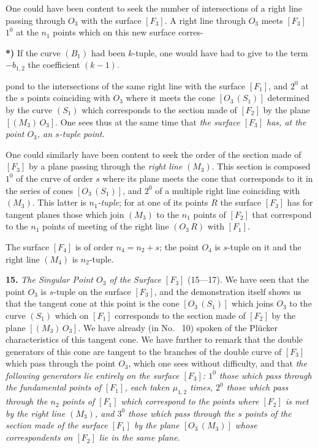 \documentclass{article}
\begin{document}
One could have been content to seek the number of intersections of a right line passing through $O_3$ with the surface $[F_3]$. A right line through $O_3$ meets $[F_3]$ $1^0$ at the $n_1$ points which on this new surface corres-

\textbf{*)} If the curve $(B_1)$ had been $k$-tuple, one would have had to give to the term $- b_{1, 2}$ the coefficient $(k - 1)$.

pond to the intersections of the same right line with the surface $[F_1]$, and $2^0$ at the $s$ points coinciding with $O_3$ where it meets the cone $[O_3\,(S_1)]$ determined by the curve $(S_1)$ which corresponds to the section made of $[F_2]$ by the plane $[(M_3)\,O_3]$. One sees thus at the same time that \emph{the surface $[F_3]$ has, at the point $O_3$, an $s$-tuple point}.

One could similarly have been content to seek the order of the section made of $[F_3]$ by a plane passing through the \emph{right line} $(M_3)$. This section is composed $1^0$ of the curve of order $s$ where its plane meets the cone that corresponds to it in the series of cones $[O_3\,(S_1)]$, and $2^0$ of a multiple right line coinciding with $(M_3)$. This latter is \emph{$n_1$-tuple}; for at one of its points $R$ the surface $[F_3]$ has for tangent planes those which join $(M_3)$ to the $n_1$ points of $[F_2]$ that correspond to the $n_1$ points of meeting of the right line $(O_3\,R)$ with $[F_1]$.

The surface $[F_4]$ is of order $n_4 = n_2 + s$; the point $O_4$ is $s$-tuple on it and the right line $(M_4)$ is $n_2$-tuple.

\textbf{15.} \emph{The Singular Point $O_3$ of the Surface $[F_3]$} (15---17). We have seen that the point $O_3$ is $s$-tuple on the surface $[F_3]$, and the demonstration itself shows us that the tangent cone at this point is the cone $[O_3\,(S_1)]$ which joins $O_3$ to the curve $(S_1)$ which on $[F_1]$ corresponds to the section made of $[F_2]$ by the plane $[(M_3)\,O_3]$. We have already (in No.~ 10) spoken of the Plücker characteristics of this tangent cone. We have further to remark that the double generators of this cone are tangent to the branches of the double curve of $[F_3]$ which pass through the point $O_3$, which one sees without difficulty, and that \emph{the following generators lie entirely on the surface $[F_3]$: $1^0$ those which pass through the fundamental points of $[F_1]$, each taken $\mu_{1, 2}$ times, $2^0$ those which pass through the $n_2$ points of $[F_1]$ which correspond to the points where $[F_2]$ is met by the right line $(M_3)$, and $3^0$ those which pass through the $s$ points of the section made of the surface $[F_1]$ by the plane $[O_3\,(M_3)]$ whose correspondents on $[F_2]$ lie in the same plane}.
\end{document}
